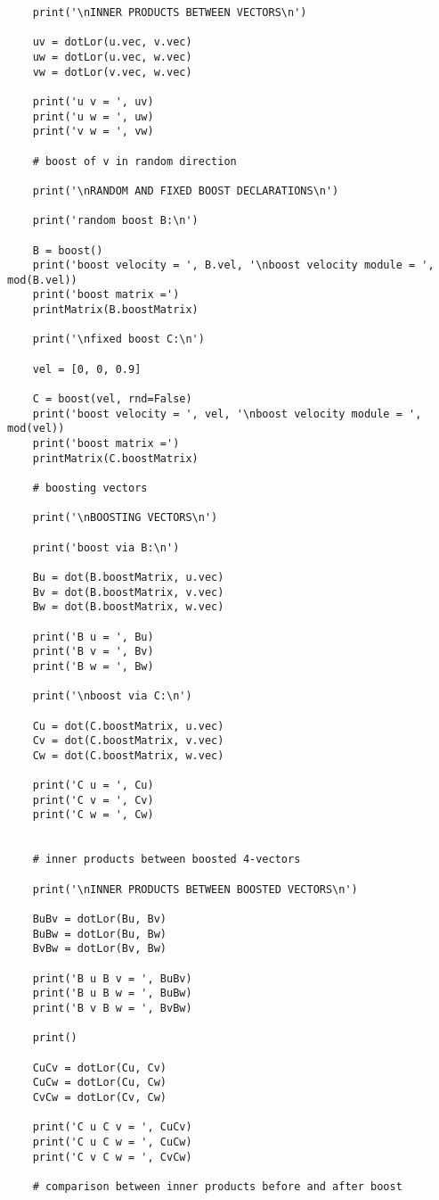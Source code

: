 \documentclass[12pt]{report}
\begin{document}
\begin{verbatim}
	print('\nINNER PRODUCTS BETWEEN VECTORS\n')
	
	uv = dotLor(u.vec, v.vec)
	uw = dotLor(u.vec, w.vec)
	vw = dotLor(v.vec, w.vec)
	
	print('u v = ', uv)
	print('u w = ', uw)
	print('v w = ', vw)
	
	# boost of v in random direction
	
	print('\nRANDOM AND FIXED BOOST DECLARATIONS\n')
	
	print('random boost B:\n')
	
	B = boost()
	print('boost velocity = ', B.vel, '\nboost velocity module = ', mod(B.vel))
	print('boost matrix =')
	printMatrix(B.boostMatrix)
	
	print('\nfixed boost C:\n')
	
	vel = [0, 0, 0.9]
	
	C = boost(vel, rnd=False)
	print('boost velocity = ', vel, '\nboost velocity module = ', mod(vel))
	print('boost matrix =')
	printMatrix(C.boostMatrix)
	
	# boosting vectors
	
	print('\nBOOSTING VECTORS\n')
	
	print('boost via B:\n')
	
	Bu = dot(B.boostMatrix, u.vec)
	Bv = dot(B.boostMatrix, v.vec)
	Bw = dot(B.boostMatrix, w.vec)
	
	print('B u = ', Bu)
	print('B v = ', Bv)
	print('B w = ', Bw)
	
	print('\nboost via C:\n')
	
	Cu = dot(C.boostMatrix, u.vec)
	Cv = dot(C.boostMatrix, v.vec)
	Cw = dot(C.boostMatrix, w.vec)
	
	print('C u = ', Cu)
	print('C v = ', Cv)
	print('C w = ', Cw)
	
	
	# inner products between boosted 4-vectors
	
	print('\nINNER PRODUCTS BETWEEN BOOSTED VECTORS\n')
	
	BuBv = dotLor(Bu, Bv)
	BuBw = dotLor(Bu, Bw)
	BvBw = dotLor(Bv, Bw)
	
	print('B u B v = ', BuBv)
	print('B u B w = ', BuBw)
	print('B v B w = ', BvBw)
	
	print()
	
	CuCv = dotLor(Cu, Cv)
	CuCw = dotLor(Cu, Cw)
	CvCw = dotLor(Cv, Cw)
	
	print('C u C v = ', CuCv)
	print('C u C w = ', CuCw)
	print('C v C w = ', CvCw)
	
	# comparison between inner products before and after boost
	

\end{verbatim}
\end{document}

